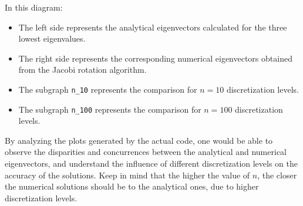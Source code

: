\documentclass{article}
\begin{document}
In this diagram:
\begin{itemize}
    \item The left side represents the analytical eigenvectors calculated for the three lowest eigenvalues.
    \item The right side represents the corresponding numerical eigenvectors obtained from the Jacobi rotation algorithm.
    \item The subgraph \texttt{n\_10} represents the comparison for \(n=10\) discretization levels.
    \item The subgraph \texttt{n\_100} represents the comparison for \(n=100\) discretization levels.
\end{itemize}

By analyzing the plots generated by the actual code, one would be able to observe the disparities and concurrences between the analytical and numerical eigenvectors, and understand the influence of different discretization levels on the accuracy of the solutions. Keep in mind that the higher the value of \(n\), the closer the numerical solutions should be to the analytical ones, due to higher discretization levels.
\end{document}
